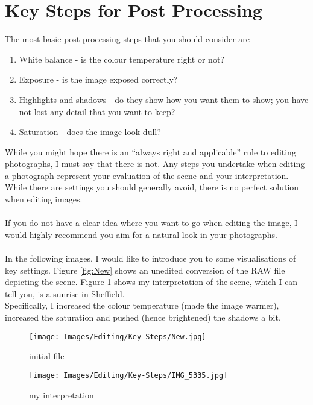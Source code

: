 \section{Key Steps for Post Processing}

The most basic post processing steps that you should consider are

\begin{enumerate}
	\item White balance - is the colour temperature right or not?
	
	\item Exposure - is the image exposed correctly?
	
	\item Highlights and shadows - do they show how you want them to show; you have not lost any detail that you want to keep?
	
	\item Saturation - does the image look dull?
\end{enumerate}

While you might hope there is an ``always right and applicable'' rule to editing photographs, I must say that there is not. Any steps you undertake when editing a photograph represent your evaluation of the scene and your interpretation. While there are settings you should generally avoid, there is no perfect solution when editing images.
\\
\\
If you do not have a clear idea where you want to go when editing the image, I would highly recommend you aim for a natural look in your photographs.
\\
\\
In the following images, I would like to introduce you to some visualisations of key settings. Figure \ref{fig:New} shows an unedited conversion of the \gls{RAW} file depicting the scene. Figure \ref{fig:IMG_5335} shows my interpretation of the scene, which I can tell you, is a sunrise in Sheffield.
\\
Specifically, I increased the colour temperature (made the image warmer), increased the saturation and pushed (hence brightened) the shadows a bit.

\begin{figure}[htbp]
\begin{minipage}{.5\textwidth}
	\centering
		\texttt{[image: Images/Editing/Key-Steps/New.jpg]}
	\caption{initial file}
	\label{fig:New}
\end{minipage}
\begin{minipage}{.5\textwidth}
	\centering
		\texttt{[image: Images/Editing/Key-Steps/IMG\_5335.jpg]}
	\caption{my interpretation}
	\label{fig:IMG_5335}
\end{minipage}
\end{figure}


